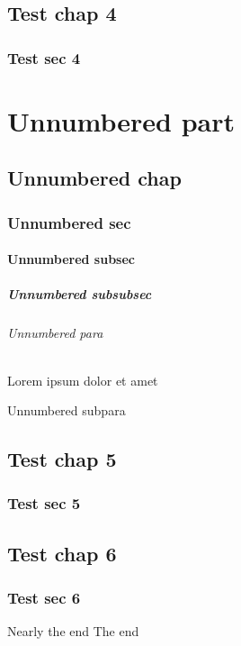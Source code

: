 \documentclass[titlepage]{article}
\begin{document}
    \chapter{Test chap 4}
    \section{Test sec 4}
    
    \part*{Unnumbered part}
    \chapter*{Unnumbered chap}
    \section*{Unnumbered sec}
    \subsection*{Unnumbered subsec}
    \subsubsection*{Unnumbered subsubsec}
    \paragraph*{Unnumbered para} Lorem ipsum dolor et amet
    \subparagraph*{Unnumbered subpara}
    
    \appendix
    \chapter{Test chap 5}
    \section{Test sec 5}
    
    \backmatter
    \chapter{Test chap 6}
    \section{Test sec 6}
    \clearpage
    Nearly the end
    \clearpage
    The end
\end{document}
